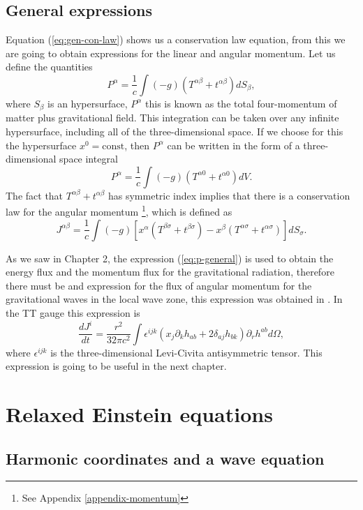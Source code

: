\subsection{General expressions}

Equation (\ref{eq:gen-con-law}) shows us a conservation law equation,
from this we are going to obtain expressions for the linear and angular
momentum. Let us define the quantities
\[
P^{\alpha}=\frac{1}{c}\int\left(-g\right)\left(T^{\alpha\beta}+t^{\alpha\beta}\right)dS_{\beta},
\]
where $S_{\beta}$ is an hypersurface, $P^{\alpha}$ this is known
as the total four-momentum of matter plus gravitational field. This
integration can be taken over any infinite hypersurface, including
all of the three-dimensional space. If we choose for this the hypersurface
$x^{0}=\text{const}$, then $P^{\alpha}$ can be written in the form
of a three-dimensional space integral
\begin{equation}
P^{\alpha}=\frac{1}{c}\int\left(-g\right)\left(T^{\alpha0}+t^{\alpha0}\right)dV.\label{eq:p-general}
\end{equation}
The fact that $T^{\alpha\beta}+t^{\alpha\beta}$ has symmetric index
implies that there is a conservation law for the angular momentum \footnote{See Appendix \ref{appendix-momentum}},
which is defined as
\[
J^{\alpha\beta}=\frac{1}{c}\int\left(-g\right)\left[x^{\alpha}\left(T^{\beta\sigma}+t^{\beta\sigma}\right)-x^{\beta}\left(T^{\alpha\sigma}+t^{\alpha\sigma}\right)\right]dS_{\sigma}.
\]

As we saw in Chapter 2, the expression (\ref{eq:p-general}) is used
to obtain the energy flux and the momentum flux for the gravitational
radiation, therefore there must be and expression for the flux of
angular momentum for the gravitational waves in the local wave zone,
this expression was obtained in \cite{THORNE-MP}. In the TT gauge this expression
is
\begin{equation}
\label{eq:an-mom-flux}
\frac{dJ^{i}}{dt}=\frac{r^{2}}{32\pi c^{2}}\int\epsilon^{ijk}\left(x_{j}\partial_{k}h_{ab}+2\delta_{aj}h_{bk}\right)\partial_{r}h^{ab}d\Omega,
\end{equation}
where $\epsilon^{ijk}$ is the three-dimensional Levi-Civita antisymmetric
tensor. This expression is going to be useful in the next chapter.

\section{Relaxed Einstein equations}

\subsection{Harmonic coordinates and a wave equation}

